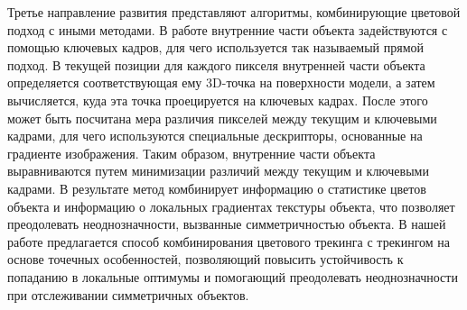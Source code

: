 Третье направление развития представляют алгоритмы, комбинирующие
цветовой подход с иными методами.
В работе \cite{Zhong2018} внутренние части объекта задействуются с помощью
ключевых кадров, для чего используется так называемый прямой подход.
В текущей позиции для каждого пикселя внутренней части объекта
определяется соответствующая ему 3D-точка на поверхности модели,
а затем вычисляется, куда эта точка проецируется на ключевых кадрах.
После этого может быть посчитана мера различия пикселей между текущим и
ключевыми кадрами, для чего используются специальные дескрипторы, основанные на
градиенте изображения.
Таким образом, внутренние части объекта выравниваются путем минимизации
различий между текущим и ключевыми кадрами.
В результате метод \cite{Zhong2018} комбинирует информацию о статистике цветов
объекта и информацию о локальных градиентах текстуры объекта, что позволяет
преодолевать неоднозначности, вызванные симметричностью объекта.
В нашей работе предлагается способ комбинирования цветового трекинга с
трекингом на основе точечных особенностей, позволяющий повысить устойчивость к
попаданию в локальные оптимумы и помогающий преодолевать неоднозначности при
отслеживании симметричных объектов.
